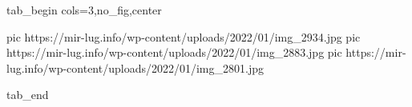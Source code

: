  
 
 
 
 


\ifcmt
  tab_begin cols=3,no_fig,center

     pic https://mir-lug.info/wp-content/uploads/2022/01/img_2934.jpg
		 pic https://mir-lug.info/wp-content/uploads/2022/01/img_2883.jpg
		 pic https://mir-lug.info/wp-content/uploads/2022/01/img_2801.jpg

  tab_end
\fi
